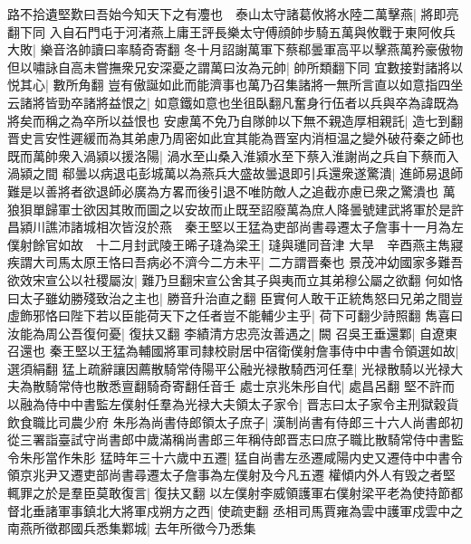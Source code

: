 路不拾遺堅歎曰吾始今知天下之有灋也　泰山太守諸葛攸將水陸二萬擊燕|{
	將即亮翻下同}
入自石門屯于河渚燕上庸王評長樂太守傅顔帥步騎五萬與攸戰于東阿攸兵大敗|{
	樂音洛帥讀曰率騎奇寄翻}
冬十月詔謝萬軍下蔡郗曇軍高平以擊燕萬矜豪傲物但以嘯詠自高未嘗撫衆兄安深憂之謂萬曰汝為元帥|{
	帥所類翻下同}
宜數接對諸將以悦其心|{
	數所角翻}
豈有傲誕如此而能濟事也萬乃召集諸將一無所言直以如意指四坐云諸將皆勁卒諸將益恨之|{
	如意鐵如意也坐徂臥翻凡奮身行伍者以兵與卒為諱既為將矣而稱之為卒所以益恨也}
安慮萬不免乃自隊帥以下無不親造厚相親託|{
	造七到翻晋史言安性遲緩而為其弟慮乃周密如此宜其能為晋室内消桓温之變外破苻秦之師也}
既而萬帥衆入渦潁以援洛陽|{
	渦水至山桑入淮潁水至下蔡入淮謝尚之兵自下蔡而入渦潁之間}
郗曇以病退屯彭城萬以為燕兵大盛故曇退即引兵還衆遂驚潰|{
	進師易退師難是以善將者欲退師必廣為方畧而後引退不唯防敵人之追截亦慮已衆之驚潰也}
萬狼狽單歸軍士欲因其敗而圖之以安故而止既至詔廢萬為庶人降曇號建武將軍於是許昌潁川譙沛諸城相次皆沒於燕　秦王堅以王猛為吏部尚書尋遷太子詹事十一月為左僕射餘官如故　十二月封武陵王晞子㻱為梁王|{
	㻱與璡同音津}
大旱　辛酉燕主雋寢疾謂大司馬太原王恪曰吾病必不濟今二方未平|{
	二方謂晋秦也}
景茂冲幼國家多難吾欲效宋宣公以社稷屬汝|{
	難乃旦翻宋宣公舍其子與夷而立其弟穆公屬之欲翻}
何如恪曰太子雖幼勝殘致治之主也|{
	勝音升治直之翻}
臣實何人敢干正統雋怒曰兄弟之間豈虛飾邪恪曰陛下若以臣能荷天下之任者豈不能輔少主乎|{
	荷下可翻少詩照翻}
雋喜曰汝能為周公吾復何憂|{
	復扶又翻}
李績清方忠亮汝善遇之|{
	闕}
召吳王垂還鄴|{
	自遼東召還也}
秦王堅以王猛為輔國將軍司隸校尉居中宿衛僕射詹事侍中中書令領選如故|{
	選須絹翻}
猛上疏辭讓因薦散騎常侍陽平公融光禄散騎西河任羣|{
	光禄散騎以光禄大夫為散騎常侍也散悉亶翻騎奇寄翻任音壬}
處士京兆朱彤自代|{
	處昌呂翻}
堅不許而以融為侍中中書監左僕射任羣為光禄大夫領太子家令|{
	晋志曰太子家令主刑獄穀貨飲食職比司農少府}
朱彤為尚書侍郎領太子庶子|{
	漢制尚書有侍郎三十六人尚書郎初從三署詣臺試守尚書郎中歲滿稱尚書郎三年稱侍郎晋志曰庶子職比散騎常侍中書監令朱彤當作朱肜}
猛時年三十六歲中五遷|{
	猛自尚書左丞遷咸陽内史又遷侍中中書令領京兆尹又遷吏部尚書尋遷太子詹事為左僕射及今凡五遷}
權傾内外人有毁之者堅輒罪之於是羣臣莫敢復言|{
	復扶又翻}
以左僕射李威領護軍右僕射梁平老為使持節都督北垂諸軍事鎮北大將軍戍朔方之西|{
	使疏吏翻}
丞相司馬賈雍為雲中護軍戍雲中之南燕所徵郡國兵悉集鄴城|{
	去年所徵今乃悉集}


